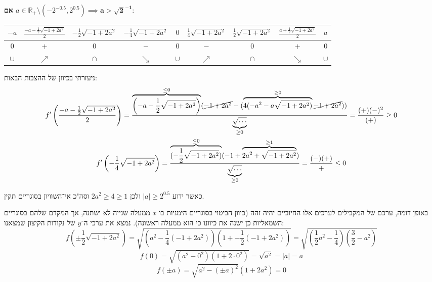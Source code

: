 \documentclass[]{article}
\newcommand\R     {\mathbb{R}}
\newcommand\cl [1]    {\left ( #1 \right )}
\begin{document}
\begin{enumerate}
\begin{itemize}
				\textbf{אם $a \in \R_+ \setminus (-2^{-0.5}, 2^{0.5}) \implies \bm{a > \sqrt{2}^{-1}}$}: 
				\begin{center}
					\begin{tabular}{|c|c|c|c|c|c|c|c|c|}
						\hline $-a$ & $\frac{- a - \frac{1}{2}\sqrt{-1 + 2a^2}}{2}$ & $- \frac{1}{2}\sqrt{-1 + 2a^2}$ & $- \frac{1}{4}\sqrt{-1 + 2a^2}$ & $0$ & $\frac{1}{4}\sqrt{-1 + 2a^2}$ & $\frac{1}{2}\sqrt{-1 + 2a^2}$ & $\frac{a + \frac{1}{2}\sqrt{-1 + 2a^2}}{2}$ & $a$ \\
						\hline $0$ & $+$ & $0$ & $-$ & $0$ & $-$ & $0$ & $+$ & $0$ \\
						\hline $\cup$ & $\nearrow$ & $\cap$ & $\searrow$ & $\cup $ & $\nearrow$ & $\cap$ & $\searrow$ & $\cup$ \\
						\hline 
					\end{tabular}
				\end{center}
				ניעזרתי בכיוון של ההצבות הבאות: 
				\begin{gather*}
					f'\cl{\frac{- a - \frac{1}{2}\sqrt{-1 + 2a^2}}{2}} = \frac{\overbrace{\cl{- a - \frac{1}{2}\sqrt{-1 + 2a^2}}}^{\le 0}(\cancel{- 1 + 2a^2} - (\overbrace{4(-a^2 - a\sqrt{-1 + 2a^2})}^{\ge 0} \cancel{-1+ 2a^2}) )}{\underbrace{\sqrt{\dots}}_{\ge 0}} = \frac{(+)(-)^2}{(+)} \ge 0 \\
					f'\cl{- \frac{1}{4}\sqrt{-1 + 2a^2}} = \frac{\overbrace{(- \frac{1}{2}\sqrt{-1 + 2a^2})}^{\le 0}(-1 + \overbrace{2a^2 + \sqrt{-1 + 2a^2}}^{\ge 1})}{\underbrace{\sqrt{\dots}}_{\ge 0}} = \frac{(-)(+)}{+} \le 0
				\end{gather*}
				
				כאשר ידוע $|a| \ge 2^{0.5}$ ולכן $2a^2 \ge 4 \ge 1$ וסה"כ אי־השוויון בסוגריים תקין. 
				
				באופן דומה, ערכם של המקבילים לערכים אלו החיוביים יהיה זהה (כיוון הביטוי בסוגריים הימניות בו $x$ ממעלה שנייה לא ישתנה, אך המקדם שלהם בסוגריים השמאליות כן ישנה את כיוונו כי הוא ממעלה ראשונה). נמצא את ערכי ה־$y$ של נקודות הקיצון שמצאנו: 
				\[ f\cl{\pm\frac{1}{2}\sqrt{-1 + 2a^2}} = \sqrt{\cl{a^2 - \frac{1}{4}(-1 + 2a^2)}\cl{1 + -\frac{1}{2}(-1 + 2a^2)}} = \sqrt{\cl{\frac{1}{2}a^2 - \frac{1}{4}}\cl{\frac{3}{2} - a^2}} \]
				\[ f(0) = \sqrt{(a^2 - 0^2)(1 + 2 \cdot 0^2)} = \sqrt{a^2} = |a| = a \]
				\[ f(\pm a) = \sqrt{a^2 - (\pm a)^2}(1 + 2a^2) = 0 \]
				

\end{itemize}
\end{enumerate}
\end{document}
